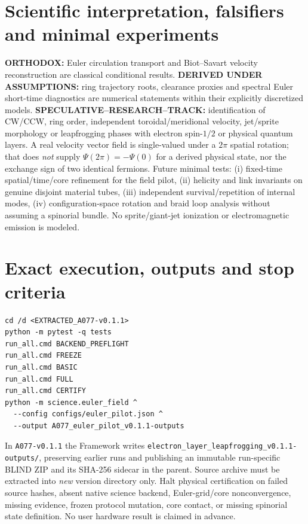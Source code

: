 \documentclass[10pt,a4paper]{article}
\begin{document}
\section{Scientific interpretation, falsifiers and minimal experiments}
\textbf{ORTHODOX:} Euler circulation transport and Biot--Savart velocity reconstruction are classical conditional results. \textbf{DERIVED UNDER ASSUMPTIONS:} ring trajectory roots, clearance proxies and spectral Euler short-time diagnostics are numerical statements within their explicitly discretized models. \textbf{SPECULATIVE--RESEARCH--TRACK:} identification of CW/CCW, ring order, independent toroidal/meridional velocity, jet/sprite morphology or leapfrogging phases with electron spin-$1/2$ or physical quantum layers. A real velocity vector field is single-valued under a $2\pi$ spatial rotation; that does \emph{not} supply $\Psi(2\pi)=-\Psi(0)$ for a derived physical state, nor the exchange sign of two identical fermions. Future minimal tests: (i) fixed-time spatial/time/core refinement for the field pilot, (ii) helicity and link invariants on genuine disjoint material tubes, (iii) independent survival/repetition of internal modes, (iv) configuration-space rotation and braid loop analysis without assuming a spinorial bundle. No sprite/giant-jet ionization or electromagnetic emission is modeled.

\section{Exact execution, outputs and stop criteria}
\begin{verbatim}
cd /d <EXTRACTED_A077-v0.1.1>
python -m pytest -q tests
run_all.cmd BACKEND_PREFLIGHT
run_all.cmd FREEZE
run_all.cmd BASIC
run_all.cmd FULL
run_all.cmd CERTIFY
python -m science.euler_field ^
  --config configs/euler_pilot.json ^
  --output A077_euler_pilot_v0.1.1-outputs
\end{verbatim}
In \texttt{A077-v0.1.1} the Framework writes \texttt{electron\_layer\_leapfrogging\_v0.1.1-outputs/}, preserving earlier runs and publishing an immutable run-specific BLIND ZIP and its SHA-256 sidecar in the parent. Source archive must be extracted into \emph{new} version directory only. Halt physical certification on failed source hashes, absent native science backend, Euler-grid/core nonconvergence, missing evidence, frozen protocol mutation, core contact, or missing spinorial state definition. No user hardware result is claimed in advance.
\end{document}
